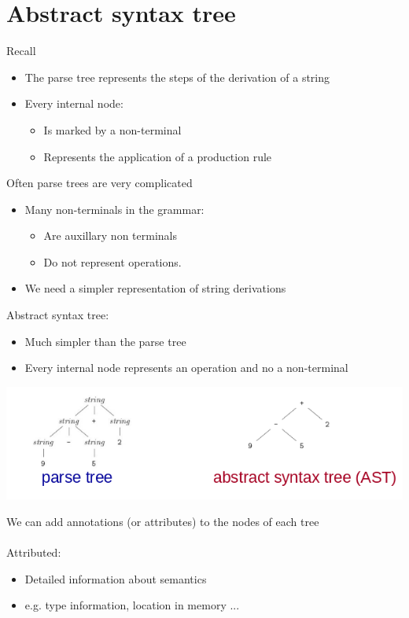 \documentclass{article}[18pt]
\begin{document}
\section{Abstract syntax tree}
Recall
\begin{itemize}
	\item The parse tree represents the steps of the derivation of a string
	\item Every internal node:
	\begin{itemize}
		\item Is marked by a non-terminal
		\item Represents the application of a production rule
	\end{itemize}
\end{itemize}
Often parse trees are very complicated
\begin{itemize}
	\item Many non-terminals in the grammar:
	\begin{itemize}
		\item Are auxillary non terminals
		\item Do not represent operations.
	\end{itemize}
	\item We need a simpler representation of string derivations
\end{itemize}
Abstract syntax tree:
\begin{itemize}
	\item Much simpler than the parse tree
	\item Every internal node represents an operation and no a non-terminal
\end{itemize}
\begin{center}
	\includegraphics[scale=0.7]{AST}
\end{center}
We can add annotations (or attributes) to the nodes of each tree\\
\\
Attributed:
\begin{itemize}
	\item Detailed information about semantics
	\item e.g. type information, location in memory ...
\end{itemize}
\end{document}
